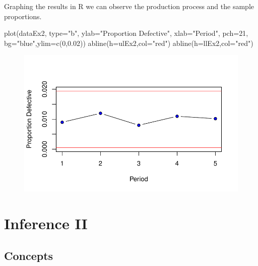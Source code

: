 \documentclass[
  letterpaper,
  DIV=11,
  numbers=noendperiod]{scrreprt}
\newenvironment{Shaded}{\begin{snugshade}}{\end{snugshade}}
\newcommand{\AttributeTok}[1]{\textcolor[rgb]{0.40,0.45,0.13}{#1}}
\newcommand{\DecValTok}[1]{\textcolor[rgb]{0.68,0.00,0.00}{#1}}
\newcommand{\FloatTok}[1]{\textcolor[rgb]{0.68,0.00,0.00}{#1}}
\newcommand{\FunctionTok}[1]{\textcolor[rgb]{0.28,0.35,0.67}{#1}}
\newcommand{\NormalTok}[1]{\textcolor[rgb]{0.00,0.23,0.31}{#1}}
\newcommand{\StringTok}[1]{\textcolor[rgb]{0.13,0.47,0.30}{#1}}
\begin{document}
Graphing the results in R we can observe the production process and the
sample proportions.

\begin{Shaded}
\begin{Highlighting}[numbers=left,,]
\FunctionTok{plot}\NormalTok{(dataEx2, }\AttributeTok{type=}\StringTok{"b"}\NormalTok{, }\AttributeTok{ylab=}\StringTok{"Proportion Defective"}\NormalTok{,}
     \AttributeTok{xlab=}\StringTok{"Period"}\NormalTok{, }\AttributeTok{pch=}\DecValTok{21}\NormalTok{, }\AttributeTok{bg=}\StringTok{"blue"}\NormalTok{,}\AttributeTok{ylim=}\FunctionTok{c}\NormalTok{(}\DecValTok{0}\NormalTok{,}\FloatTok{0.02}\NormalTok{))}
\FunctionTok{abline}\NormalTok{(}\AttributeTok{h=}\NormalTok{ulEx2,}\AttributeTok{col=}\StringTok{"red"}\NormalTok{)}
\FunctionTok{abline}\NormalTok{(}\AttributeTok{h=}\NormalTok{llEx2,}\AttributeTok{col=}\StringTok{"red"}\NormalTok{)}
\end{Highlighting}
\end{Shaded}

\begin{figure}[H]

{\centering \includegraphics{./12-InferenceI_files/figure-pdf/unnamed-chunk-22-1.pdf}

}

\end{figure}

\hypertarget{inference-ii}{%
\chapter{Inference II}\label{inference-ii}}

\hypertarget{concepts-11}{%
\section{Concepts}\label{concepts-11}}
\end{document}
